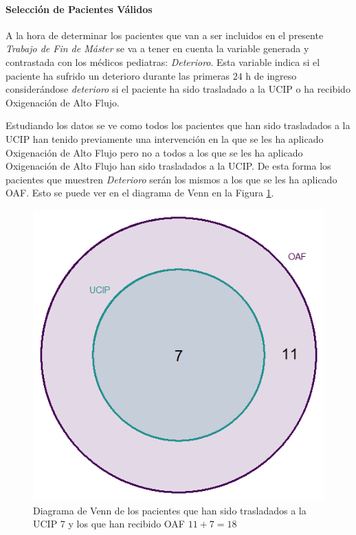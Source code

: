 \paragraph{Selección de Pacientes Válidos}\label{sec:seleccion_pacientes}

 A la hora de determinar los pacientes que van a ser incluidos en el presente \textit{Trabajo de Fin de Máster} se va a tener en cuenta la variable generada y contrastada con los médicos pediatras: \textit{Deterioro}. Esta variable indica si el paciente ha sufrido un deterioro durante las primeras $24$ h de ingreso considerándose \textit{deterioro} si el paciente ha sido trasladado a la UCIP o ha recibido Oxigenación de Alto Flujo. 

 Estudiando los datos se ve como todos los pacientes que han sido trasladados a la UCIP han tenido previamente una intervención en la que se les ha aplicado Oxigenación de Alto Flujo pero no a todos a los que se les ha aplicado Oxigenación de Alto Flujo han sido trasladados a la UCIP. De esta forma los pacientes que muestren \textit{Deterioro} serán los mismos a los que se les ha aplicado OAF. Esto se puede ver en el diagrama de Venn en la Figura \ref{fig:venn-OAF-UCIP}.

\begin{figure}[H]
    \centering
    \includegraphics[scale = 1.50]{./img/venn-diagram-OAF-UCIP.png}
    \caption{Diagrama de Venn de los pacientes que han sido trasladados a la UCIP 7 y los que han recibido OAF $11 + 7 = 18$}
    \label{fig:venn-OAF-UCIP}
\end{figure}


